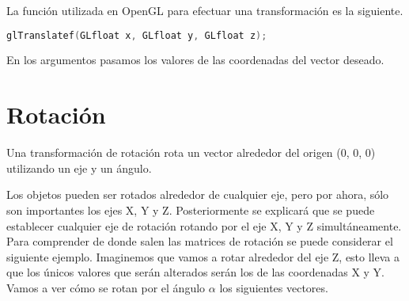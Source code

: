 La función utilizada en OpenGL para efectuar una transformación es la siguiente.
\begin{lstlisting}[language=C]
  glTranslatef(GLfloat x, GLfloat y, GLfloat z);
\end{lstlisting}
En los argumentos pasamos los valores de las coordenadas del vector deseado.

\section{Rotación}
Una transformación de rotación rota un vector alrededor del origen (0, 0, 0) utilizando un eje y un ángulo.
\begin{figure} [ht!]
  \centering
\end{figure}

Los objetos pueden ser rotados alrededor de cualquier eje, pero por ahora, sólo son importantes los ejes X, Y y Z. Posteriormente se explicará que se puede establecer cualquier eje de rotación rotando por el eje X, Y y Z simultáneamente.
Para comprender de donde salen las matrices de rotación se puede considerar el siguiente ejemplo. Imaginemos que vamos a rotar alrededor del eje Z, esto lleva a que los únicos valores que serán alterados serán los de las coordenadas X y Y. Vamos a ver cómo se rotan por el ángulo $\alpha$ los siguientes vectores.

